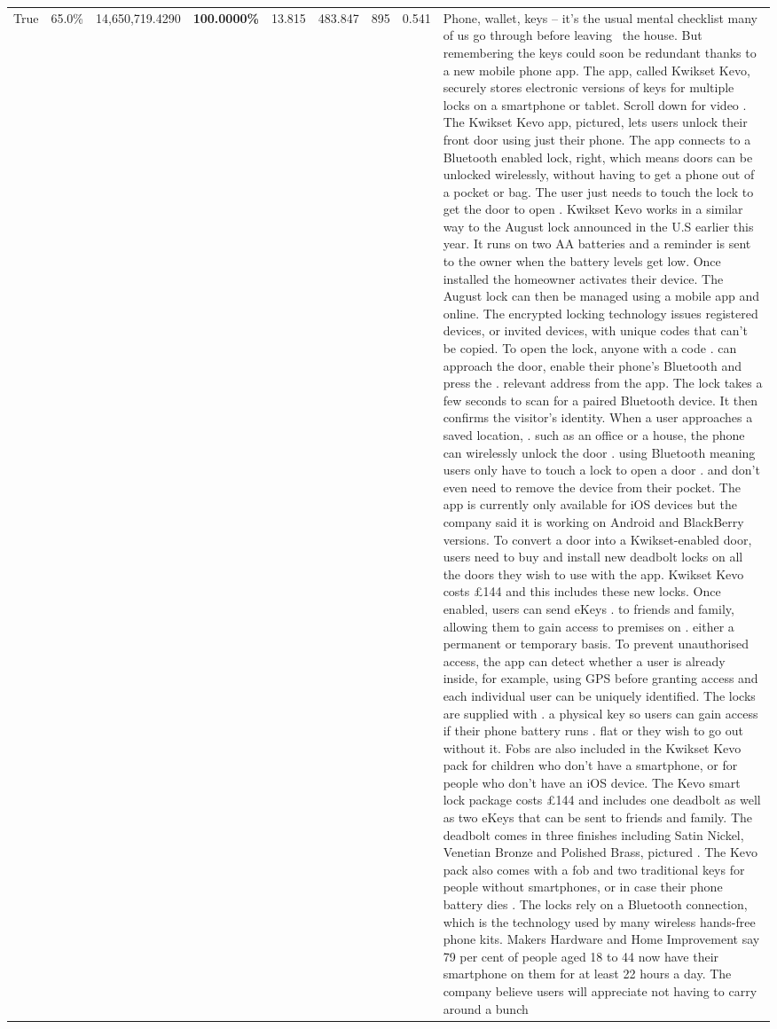 \begin{table}[H]
\begin{tabular}{lllrlllll}
True & 65.0\% & 14,650,719.4290 & \bfseries \color{red} 100.0000\% & 13.815 & 483.847 & 895 & 0.541 & Phone, wallet, keys – it’s the usual mental checklist many of us go through before leaving  the house. But remembering the keys could soon be redundant thanks to a new mobile phone app. The app, called Kwikset Kevo, securely stores electronic versions of keys for multiple locks on a smartphone or tablet. Scroll down for video . The Kwikset Kevo app, pictured, lets users unlock their front door using just their phone. The app connects to a Bluetooth enabled lock, right, which means doors can be unlocked wirelessly, without having to get a phone out of a pocket or bag. The user just needs to touch the lock to get the door to open . Kwikset Kevo works in a similar way to the August lock announced in the U.S earlier this year. It runs on two AA batteries and a reminder is sent to the owner when the battery levels get low. Once installed the homeowner activates their device. The August lock can then be managed using a mobile app and online. The encrypted locking technology issues registered devices, or invited devices, with unique codes that can't be copied. To open the lock, anyone with a code . can approach the door, enable their phone's Bluetooth and press the . relevant address from the app. The lock takes a few seconds to scan for a paired Bluetooth device. It then confirms the visitor's identity. When a user approaches a saved location, . such as an office or a house, the phone can wirelessly unlock the door . using Bluetooth meaning users only have to touch a lock to open a door . and don't even need to remove the device from their pocket. The app is currently only available for iOS devices but the company said it is working on Android and BlackBerry versions. To convert a door into a Kwikset-enabled door, users need to buy and install new deadbolt locks on all the doors they wish to use with the app. Kwikset Kevo costs £144 and this includes these new locks. Once enabled, users can send eKeys . to friends and family, allowing them to gain access to premises on . either a permanent or temporary basis. To prevent unauthorised access, the app can detect whether a user is already inside, for example, using GPS before granting access and each individual user can be uniquely identified. The locks are supplied with . a physical key so users can gain access if their phone battery runs . flat or they wish to go out without it. Fobs are also included in the Kwikset Kevo pack for children who don't have a smartphone, or for people who don't have an iOS device. The Kevo smart lock package costs £144 and includes one deadbolt as well as two eKeys that can be sent to friends and family. The deadbolt comes in three finishes including Satin Nickel, Venetian Bronze and Polished Brass, pictured . The Kevo pack also comes with a fob and two traditional keys for people without smartphones, or in case their phone battery dies . The locks rely on a Bluetooth connection, which is the technology used by many wireless hands-free phone kits. Makers Hardware and Home Improvement say 79 per cent of people aged 18 to 44 now have their smartphone on them for at least 22 hours a day. The company believe users will appreciate not having to carry around a bunch 
\end{tabular}
\end{table}
